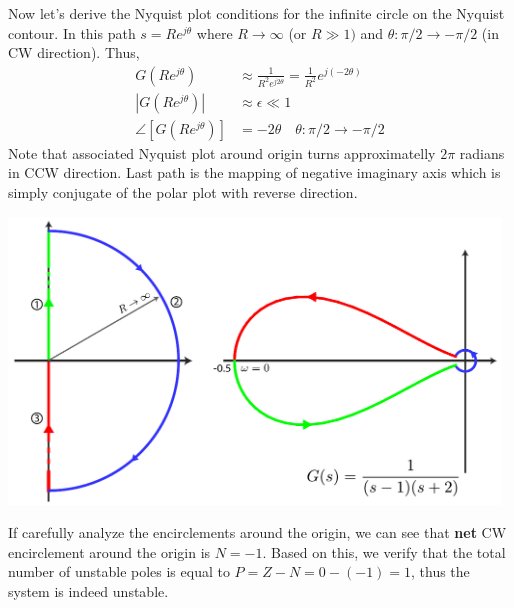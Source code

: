 \documentclass[twoside]{article}
\begin{document}
Now let's derive the Nyquist plot conditions for the infinite circle
on the Nyquist contour. In this path $s = R e^{j \theta}$ where $R \to
\infty$ (or $R \gg 1)$ and $\theta : \pi/2 \to - \pi/2$ (in CW
direction). Thus,
%
\begin{align*}
  G(R e^{j \theta}) &\approx \frac{1}{R^2 e^{j 2\theta}} =
  \frac{1}{R^2} e^{j (-2\theta)}
\\
  | G(R e^{j \theta}) | &\approx \epsilon \ll 1
\\
 \angle [ G(R e^{j \theta}) ] &= - 2 \theta \quad \theta : \pi/2 \to -\pi/2
\end{align*}
%
Note that associated Nyquist plot around origin turns approximatelly
$2 \pi$ radians in CCW direction. Last path is the mapping of negative imaginary axis which is simply
conjugate of the polar plot with reverse direction. 

\vspace{6 pt}

  \begin{minipage}[h]{1\linewidth}
    \begin{center}
      \includegraphics[width=0.98\textwidth]{ex5}
    \end{center}
  \end{minipage}

\vspace{6 pt}

If carefully analyze the encirclements around the origin, 
we can see that \textbf{net} CW encirclement around the origin is 
$N = - 1$. Based on this, we verify that   
the total number of unstable poles is equal to
$P = Z - N = 0 - (-1) = 1$, thus the system is indeed unstable. 


\end{document}

